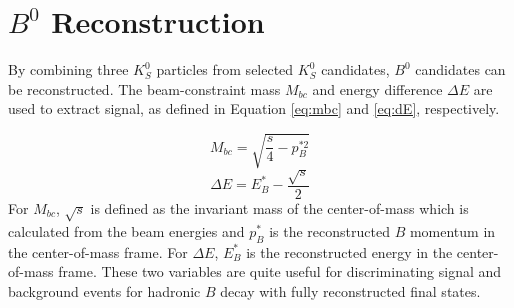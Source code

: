  
 
 


\section{$B^0$  Reconstruction}
By combining three $K_S^0$ particles from selected $K_S^0$ candidates, $B^0$ candidates can be reconstructed. The beam-constraint mass $M_{bc}$ and energy difference $\Delta E$ are used to extract signal, as defined in Equation \ref{eq:mbc} and \ref{eq:dE}, respectively. 

\begin{equation}\label{eq:mbc}
M_{bc} = \sqrt{\frac{s}{4}-p^{*2}_B} 
\end{equation}
\begin{equation}\label{eq:dE}
\Delta E = E^*_B - \frac{\sqrt{s}}{2}
\end{equation}
For $M_{bc}$, $\sqrt{s}$ is defined as the invariant mass of the center-of-mass which is calculated from the beam energies and $p^*_B$ is the reconstructed $B$ momentum in the center-of-mass frame. For $\Delta E$, $E^*_B$ is the reconstructed energy in the center-of-mass frame. These two variables are quite useful for discriminating signal and background events for hadronic $B$ decay with fully reconstructed final states.

